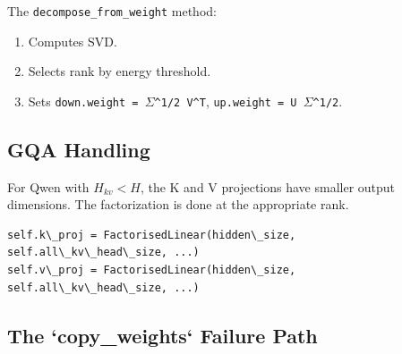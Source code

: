 The \texttt{decompose\_from\_weight} method:
\begin{enumerate}
\item Computes SVD.
\item Selects rank by energy threshold.
\item Sets \texttt{down.weight = $\Sigma$^{1/2} V^T}, \texttt{up.weight = U $\Sigma$^{1/2}}.

\end{enumerate}
\subsection{GQA Handling}

For Qwen with $H_{kv} < H$, the K and V projections have smaller output 
dimensions. The factorization is done at the appropriate rank.

\begin{lstlisting}
self.k\_proj = FactorisedLinear(hidden\_size, self.all\_kv\_head\_size, ...)
self.v\_proj = FactorisedLinear(hidden\_size, self.all\_kv\_head\_size, ...)
\end{lstlisting}

\subsection{The `copy\_weights` Failure Path}

